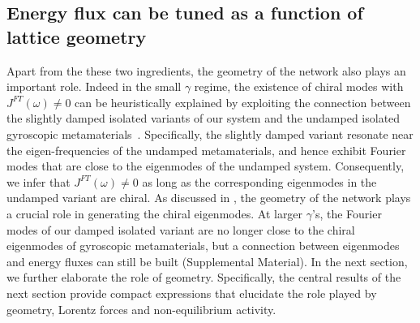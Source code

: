 \documentclass[
 preprint,
 preprintnumbers,
 amsmath,amssymb,
 aps,
 pre,
 longbibliography,
 superscriptaddress,
 10pt, twocolumn
]{revtex4-1}
\begin{document}
\subsection{Energy flux can be tuned as a function of lattice geometry} 
Apart from the these two ingredients, the geometry of the network also plays an important role.
Indeed in the small $\gamma$ regime, the existence of chiral modes with $J^{FT}(\omega)\neq 0$ can be heuristically explained by exploiting the connection between the slightly damped isolated variants of our system and the undamped isolated gyroscopic metamaterials~\cite{Nash2015TopologicalMechanics,Mitchell2018AmorphousTopological}.
Specifically, the slightly damped variant resonate near the eigen-frequencies of the undamped metamaterials, and hence exhibit Fourier modes that are close to the eigenmodes of the undamped system. Consequently, we infer that $J^{FT}(\omega)\neq 0$ as long as the corresponding eigenmodes in the undamped variant are chiral. As discussed in  \cite{Nash2015TopologicalMechanics}, the geometry of the network plays a crucial role in generating the chiral eigenmodes.
At larger $\gamma$'s, the Fourier modes of our damped isolated variant are no longer close to the chiral eigenmodes of gyroscopic metamaterials, but a connection between eigenmodes and energy fluxes can still be built (Supplemental Material).
In the next section, we further elaborate the role of geometry. Specifically, the central results of the next section provide compact expressions that elucidate the role played by geometry, Lorentz forces and non-equilibrium activity.

\end{document}
